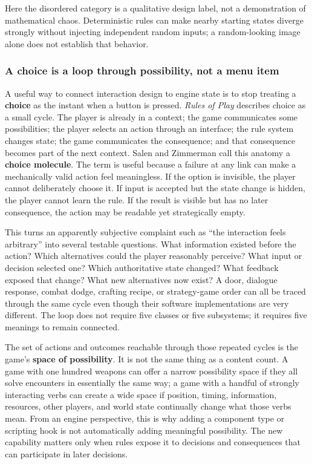 Here the disordered category is a qualitative design label, not a demonstration of mathematical chaos. Deterministic rules can make nearby starting states diverge strongly without injecting independent random inputs; a random-looking image alone does not establish that behavior.

\subsubsection{A choice is a loop through possibility, not a menu item}\label{05-engine-i-ch009-a-choice-is-a-loop-through-possibility-not-a-menu-item}

\hypertarget{05-engine-i-ch009-a-choice-is-a-loop-through-possibility-not-a-menu-item}{}

A useful way to connect interaction design to engine state is to stop treating a \textbf{choice} as the instant when a button is pressed. \emph{Rules of Play} describes choice as a small cycle. The player is already in a context; the game communicates some possibilities; the player selects an action through an interface; the rule system changes state; the game communicates the consequence; and that consequence becomes part of the next context. Salen and Zimmerman call this anatomy a \textbf{choice molecule}. The term is useful because a failure at any link can make a mechanically valid action feel meaningless. If the option is invisible, the player cannot deliberately choose it. If input is accepted but the state change is hidden, the player cannot learn the rule. If the result is visible but has no later consequence, the action may be readable yet strategically empty.

This turns an apparently subjective complaint such as ``the interaction feels arbitrary'' into several testable questions. What information existed before the action? Which alternatives could the player reasonably perceive? What input or decision selected one? Which authoritative state changed? What feedback exposed that change? What new alternatives now exist? A door, dialogue response, combat dodge, crafting recipe, or strategy-game order can all be traced through the same cycle even though their software implementations are very different. The loop does not require five classes or five subsystems; it requires five meanings to remain connected.

The set of actions and outcomes reachable through those repeated cycles is the game's \textbf{space of possibility}. It is not the same thing as a content count. A game with one hundred weapons can offer a narrow possibility space if they all solve encounters in essentially the same way; a game with a handful of strongly interacting verbs can create a wide space if position, timing, information, resources, other players, and world state continually change what those verbs mean. From an engine perspective, this is why adding a component type or scripting hook is not automatically adding meaningful possibility. The new capability matters only when rules expose it to decisions and consequences that can participate in later decisions.

